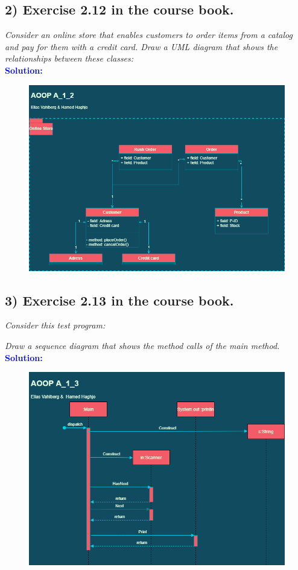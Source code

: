 \documentclass{article}
\begin{document}
\subsection*{2) Exercise 2.12 in the course book.}
\hypertarget{E2}{ }
\textit{Consider an online store that enables customers to order items from a catalog and
pay for them with a credit card. Draw a UML diagram that shows the relationships
between these classes:}\\
\indent \textbf{\textcolor{blue}{Solution:}} \\
\begin{figure}[H]
\includegraphics[width=\linewidth]{AOOP_A1_2}
\centering
\end{figure}
\newpage


\subsection*{3) Exercise 2.13 in the course book.}
\hypertarget{E3}{ }
\textit{Consider this test program:}

\textit{Draw a sequence diagram that shows the method calls of the main method.} \\
\indent \textbf{\textcolor{blue}{Solution:}} \\
\begin{figure}[H]
\includegraphics[width=\linewidth]{AOOP_A1_3}
\centering
\end{figure}
\end{document}
